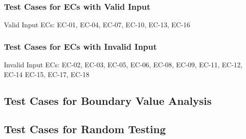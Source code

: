 \documentclass[11pt, oneside]{article}   	%
\begin{document}
\subsubsection{Test Cases for ECs with Valid Input}
Valid Input ECs: EC-01, EC-04, EC-07, EC-10, EC-13, EC-16
	

\subsubsection{Test Cases for ECs with Invalid Input}
Invalid Input ECs: EC-02, EC-03, EC-05, EC-06, EC-08, EC-09, EC-11, EC-12, EC-14 EC-15, EC-17, EC-18


\subsection{Test Cases for Boundary Value Analysis}
\subsection{Test Cases for Random Testing}
\end{document}
